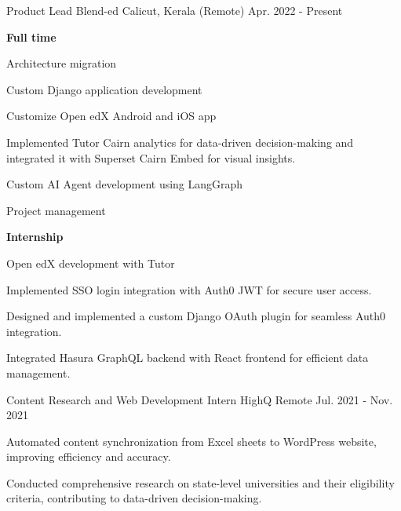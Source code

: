 
\begin{cventries}
  \cventry
    {Product Lead} %
    {Blend-ed} %
    {Calicut, Kerala (Remote)   } %
    {Apr. 2022 - Present} %
    {
      \begin{cvitems} %
        \item \textbf{Full time}
        \item Architecture migration
        \item Custom Django application development
        \item Customize Open edX Android and iOS app
        \item Implemented Tutor Cairn analytics for data-driven decision-making and integrated it with Superset Cairn Embed for visual insights.
        \item Custom AI Agent development using LangGraph
        \item Project management
        \vspace{2mm}
        \item \textbf{Internship}
        \item Open edX development with Tutor
        \item Implemented SSO login integration with Auth0 JWT for secure user access.
        \item Designed and implemented a custom Django OAuth plugin for seamless Auth0 integration.
        \item Integrated Hasura GraphQL backend with React frontend for efficient data management.
      \end{cvitems}
    }

  \cventry
    {Content Research and Web Development Intern} %
    {HighQ} %
    {Remote} %
    {Jul. 2021 - Nov. 2021} %
    {
      \begin{cvitems} %
        \item Automated content synchronization from Excel sheets to WordPress website, improving efficiency and accuracy.
        \item Conducted comprehensive research on state-level universities and their eligibility criteria, contributing to data-driven decision-making.
      \end{cvitems}
    }
    
\end{cventries}
